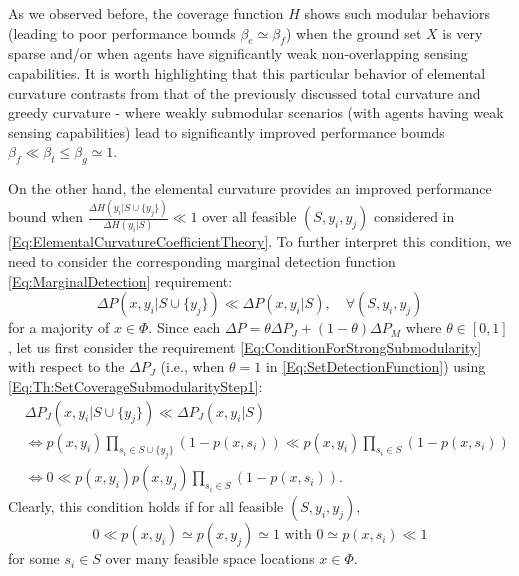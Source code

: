 \documentclass[letterpaper, 10 pt, conference]{ieeeconf}
\begin{document}
As we observed before, the coverage function $H$ shows such modular behaviors (leading to poor performance bounds $\beta_e\simeq \beta_f$) when the ground set $X$ is very sparse and/or when agents have significantly weak non-overlapping sensing capabilities. It is worth highlighting that this particular behavior of elemental curvature contrasts from that of the previously discussed total curvature and greedy curvature - where weakly submodular scenarios (with agents having weak sensing capabilities) lead to significantly improved performance bounds $\beta_f \ll \beta_t \leq \beta_g \simeq 1$.


On the other hand, the elemental curvature provides an improved performance bound when $\frac{\Delta H(y_i \vert S \cup \{y_j\})}{\Delta H(y_i \vert S)} \ll 1$ over all feasible $(S,y_i,y_j)$ considered in \eqref{Eq:ElementalCurvatureCoefficientTheory}. To further interpret this condition, we need to consider the corresponding marginal detection function \eqref{Eq:MarginalDetection} requirement:
\begin{equation}\label{Eq:ConditionForStrongSubmodularity}
\Delta P(x,y_i \vert S \cup \{y_j\}) \ll \Delta P(x, y_i \vert S), \quad \forall (S,y_i,y_j)    
\end{equation}
for a majority of $x\in\Phi$. Since each $\Delta P = \theta \Delta P_J + (1-\theta)\Delta P_M$ where $\theta \in [0,1]$, let us first consider the requirement \eqref{Eq:ConditionForStrongSubmodularity} with respect to the $\Delta P_J$ (i.e., when $\theta = 1$ in \eqref{Eq:SetDetectionFunction}) using \eqref{Eq:Th:SetCoverageSubmodularityStep1}:
\begin{align}
    &\Delta P_J(x,y_i \vert S \cup \{y_j\}) \ll \Delta P_J(x, y_i \vert S) \nonumber\\
    &\iff p(x,y_i)\prod_{s_i\in S\cup\{y_j\}}(1-p(x,s_i))\ll 
    p(x,y_i)\prod_{s_i\in S}(1-p(x,s_i))\nonumber\\
    &\iff 0 \ll p(x,y_i)p(x,y_j)\prod_{s_i\in S}(1-p(x,s_i)). \nonumber
\end{align}
Clearly, this condition holds if for all feasible $(S,y_i,y_j)$, 
\begin{equation}\label{Eq:ConditionForStrongSubmodularity1}
    0 \ll p(x,y_i) \simeq p(x,y_j) \simeq 1 \mbox{ with } 0 \simeq p(x,s_i) \ll 1
\end{equation}
for some $s_i\in S$ over many feasible space locations $x\in\Phi$.
\end{document}
